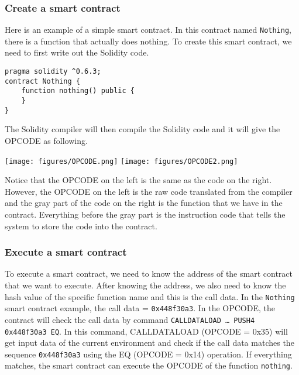 \documentclass{article}
\begin{document}
\subsubsection*{Create a smart contract}
Here is an example of a simple smart contract. In this contract named \texttt{Nothing}, there is a function that actually does nothing. To create this smart contract, we need to first write out the Solidity code.
\begin{lstlisting}
pragma solidity ^0.6.3;
contract Nothing {
    function nothing() public {
    }
}
\end{lstlisting}
The Solidity compiler will then compile the Solidity code and it will give the OPCODE as following.
\begin{center}
    \texttt{[image: figures/OPCODE.png]}
    \hspace{1cm}
    \texttt{[image: figures/OPCODE2.png]}
\end{center}
Notice that the OPCODE on the left is the same as the code on the right. However, the OPCODE on the left is the raw code translated from the compiler and the gray part of the code on the right is the function that we have in the contract. Everything before the gray part is the instruction code that tells the system to store the code into the contract.
\subsubsection*{Execute a smart contract}
To execute a smart contract, we need to know the address of the smart contract that we want to execute. After knowing the address, we also need to know the hash value of the specific function name and this is the call data. In the \texttt{Nothing} smart contract example, the call data = \texttt{0x448f30a3}. In the OPCODE, the contract will check the call data by command \texttt{CALLDATALOAD … PUSH4 0x448f30a3 EQ}. In this command, CALLDATALOAD (OPCODE = 0x35) will get input data of the current environment and check if the call data matches the sequence \texttt{0x448f30a3} using the EQ (OPCODE = 0x14) operation. If everything matches, the smart contract can execute the OPCODE of the function \texttt{nothing}.
\end{document}
